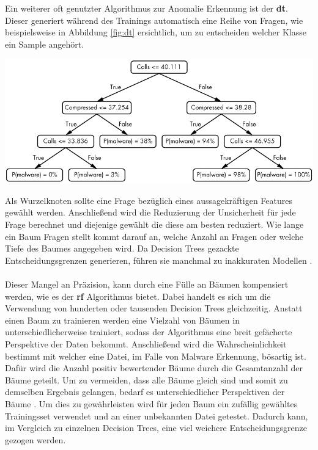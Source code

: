 \documentclass[
    12pt, %
    DIV10,
    ngerman, %
    a4paper, %
    oneside, %
    titlepage, %
    parskip=half, %
    headings=normal, %
    listof=totoc, %
    bibliography=totoc, %
    index=totoc, %
    captions=tableheading, %
    final %
]{scrreprt}
\begin{document}
\\\\
Ein weiterer oft genutzter Algorithmus zur Anomalie Erkennung ist der \textbf{\acl{dt}}. Dieser generiert während des Trainings automatisch eine Reihe von Fragen, wie beispielsweise in Abbildung \ref{fig:dt} ersichtlich, um zu entscheiden welcher Klasse ein Sample angehört.
\begin{center}
\includegraphics[scale=0.4]{img/dt.png}
\label{fig:dt}
\end{center}
Als Wurzelknoten sollte eine Frage bezüglich eines aussagekräftigen Features gewählt werden. Anschlie{\ss}end wird die Reduzierung der Unsicherheit für jede Frage berechnet und diejenige gewählt die diese am besten reduziert. 
Wie lange ein Baum Fragen stellt kommt darauf an, welche Anzahl an Fragen oder welche Tiefe des Baumes angegeben wird.
Da Decision Trees gezackte Entscheidungsgrenzen generieren, führen sie manchmal zu inakkuraten Modellen \parencite{JoshuaSaxe2018}.
\\\\
Dieser Mangel an Präzision, kann durch eine Fülle an Bäumen kompensiert werden, wie es der \textbf{\acl{rf}} Algorithmus bietet.
Dabei handelt es sich um die Verwendung von hunderten oder tausenden Decision Trees gleichzeitig. Anstatt einen Baum zu trainieren werden eine Vielzahl von Bäumen in unterschiedlicherweise trainiert, sodass der Algorithmus eine breit gefächerte Perspektive der Daten bekommt. Anschlie{\ss}end wird die Wahrscheinlichkeit bestimmt mit welcher eine Datei, im Falle von Malware Erkennung, bösartig ist. Dafür wird die Anzahl positiv bewertender Bäume durch die Gesamtanzahl der Bäume geteilt. Um zu vermeiden, dass alle Bäume gleich sind und somit zu demselben Ergebnis gelangen, bedarf es unterschiedlicher Perspektiven der Bäume \parencite{JoshuaSaxe2018}. Um dies zu gewährleisten wird für jeden Baum ein zufällig gewähltes Trainingsset verwendet und an einer unbekannten Datei getestet. Dadurch kann, im Vergleich zu einzelnen Decision Trees, eine viel weichere Entscheidungsgrenze gezogen werden.
\end{document}
